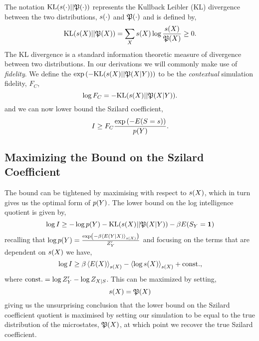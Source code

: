 \documentclass[]{article}
\begin{document}
The notation $\text{KL}(s(\cdot)||\mathfrak{P}(\cdot))$ represents the Kullback Leibler (KL) divergence\citep{Kullback-info51} between the two distributions, $s(\cdot)$ and $\mathfrak{P}(\cdot)$ and is defined by,
$$
\text{KL}(s(X) || \mathfrak{P}(X)) = \sum_X s(X) \log\frac{s(X)}{\mathfrak{P}(X)} \geq 0.
$$
The KL divergence is a standard information theoretic measure of divergence between two distributions. In our derivations we will commonly make use of \emph{fidelity}. We define the $\exp\left(-
\text{KL}(s(X)||\mathfrak{P}(X|Y))\right)$
to be the \emph{contextual} simulation fidelity, $F_C$,
\[
\log F_C =
-\text{KL}(s(X)||\mathfrak{P}(X|Y)).
\]
and we can now lower bound the Szilard coefficient,
\[
I \geq F_C \frac{\exp\left(-E(S=s)\right)}{p(Y)}.
\]


\subsection{Maximizing the Bound on the Szilard Coefficient}

The bound can be tightened by maximising with respect to $s(X)$, which in turn gives us the optimal form of $p(Y)$. The lower bound on the log intelligence quotient is given by,
\[
\log I \geq - \log p(Y) -\text{KL}(s(X)||\mathfrak{P}(X|Y)) - \beta E(S_Y = \textbf{1})
\]
recalling that $\log p(Y) = \frac{\exp\left(-\beta\left\langle E(Y|X) \right\rangle_{s(X)}\right)}{Z^\prime_Y}$ and focusing on the terms that are dependent on $s(X)$ we have,
\[
\log I \geq \beta \left\langle E(X) \right\rangle_{s(X)} - \left\langle \log s(X) \right\rangle_{s(X)} + \text{const.},
\]
where $\text{const.} = \log Z^\prime_Y - \log Z_{X|S}$. This can be maximized by setting,
\[
s(X) = \mathfrak{P}(X)
\]
giving us the unsurprising conclusion that the lower bound on the Szilard coefficient quotient is maximised by setting our simulation to be equal to the true distribution of the microstates, $\mathfrak{P}(X)$, at which point we recover the true Szilard coefficient.
\end{document}
